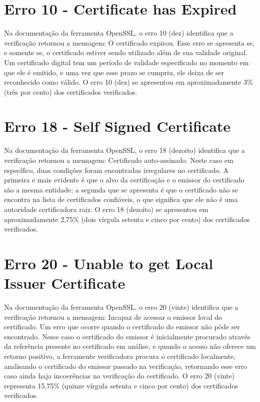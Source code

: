 \section[Erro 10 - Certificate has Expired]{Erro 10 - Certificate has Expired}

	Na documentação da ferramenta OpenSSL, o erro 10 (dez) identifica que a verificação retornou a mensagem: O certificado expirou.
	Esse erro se apresenta se, e somente se, o certificado estiver sendo utilizado além de sua validade original. Um certificado digital tem um período de validade especificado no momento em que ele é emitido, e uma vez que esse prazo se cumpriu, ele deixa de ser reconhecido como válido. O erro 10 (dez) se apresentou em aproximadamente 3\% (três por cento) dos certificados verificados.

\section[Erro 18 - Self Signed Certificate]{Erro 18 - Self Signed Certificate}

	Na documentação da ferramenta OpenSSL, o erro 18 (dezoito) identifica que a verificação retornou a mensagem: Certificado auto-assinado.
	Neste caso em específico, duas condições foram encontradas irregulares no certificado. A primeira e mais evidente é que o alvo da certificação e o emissor do certificado são a mesma entidade; a segunda que se apresenta é que o certificado não se encontra na lista de certificados confiáveis, o que significa que ele não é uma autoridade certificadora raiz.
	O erro 18 (dezoito) se apresentou em aproximadamente 2,75\% (dois vírgula setenta e cinco por cento) dos certificados verificados.
	
\section[Erro 20 - Unable to get Local Issuer Certificate]{Erro 20 - Unable to get Local Issuer Certificate}

	Na documentação da ferramenta OpenSSL, o erro 20 (vinte) identifica que a verificação retornou a mensagem: Incapaz de acessar o emissor local do certificado.
	Um erro que ocorre quando o certificado do emissor não pôde ser encontrado. Nesse caso o certificado do emissor é inicialmente procurado através da referência presente no certificado em análise, e quando o acesso não oferece um retorno positivo, a ferramente verificadora procura o certificado localmente, analisando o certificado do emissor passado na verificação, retornando esse erro caso ainda haja incoerências na verificação do certificado.
	O erro 20 (vinte) representa 15,75\% (quinze vírgula setenta e cinco por cento) dos certificados verificados.
